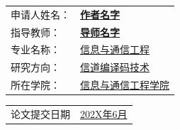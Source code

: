 \vspace{20pt}

\begin{center}
     \songti
    \begin{tabularx}{.6\textwidth}{>{\songti}l >{\songti}X<{\centering}}
        申请人姓名： & \bfseries \uline{\hfill 作者名字 \hfill}        \\
        指导教师：   & \bfseries \uline{\hfill 导师名字 \hfill} \hfill \\
        专业名称：   & \uline{\hfill 信息与通信工程 \hfill}                \\
        研究方向：   & \uline{\hfill 信道编译码技术 \hfill}              \\
        所在学院：   & \uline{\hfill 信息与通信工程学院 \hfill}          \\
    \end{tabularx}
\end{center}

\vspace{20pt}

\begin{center}
     \bfseries
    \begin{tabularx}{.5\textwidth}{>{\songti}l >{\songti}X<{\centering}}
        论文提交日期 & \uline{\hfill 202X年6月 \hfill}
    \end{tabularx}
\end{center}

\restoregeometry
